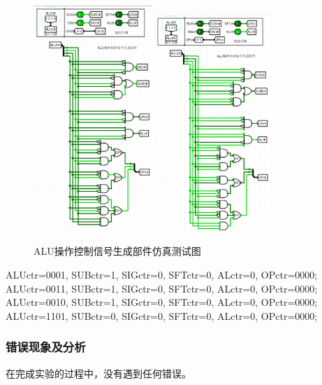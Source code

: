 \documentclass{article}
\begin{document}
    \begin{figure}[H]
    \centering
    \includegraphics[width=0.4\textwidth]{5.5.3.png}
    \includegraphics[width=0.4\textwidth]{5.5.4.png}
    \caption{ALU操作控制信号生成部件仿真测试图}
    \end{figure}
    ALUctr=0001, SUBctr=1, SIGctr=0, SFTctr=0, ALctr=0, OPctr=0000;\\
    ALUctr=0011, SUBctr=1, SIGctr=0, SFTctr=0, ALctr=0, OPctr=0000;\\
    ALUctr=0010, SUBctr=1, SIGctr=0, SFTctr=0, ALctr=0, OPctr=0000;\\
    ALUctr=1101, SUBctr=0, SIGctr=0, SFTctr=0, ALctr=0, OPctr=0000;

    \subsubsection{错误现象及分析}
    在完成实验的过程中，没有遇到任何错误。
\end{document}
